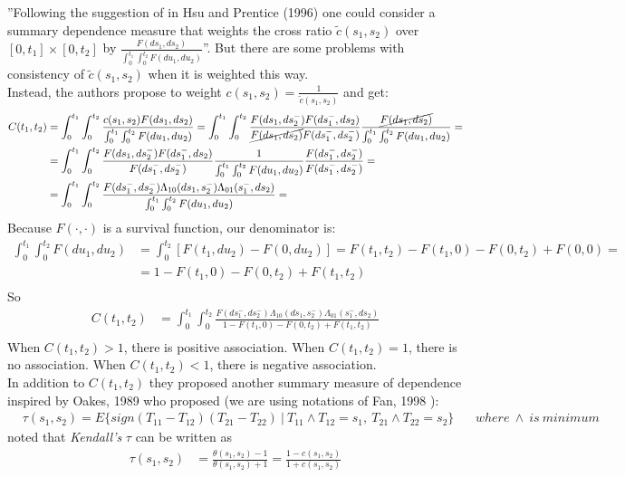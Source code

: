 \documentclass[]{article}
\begin{document}
''Following the suggestion of in Hsu and Prentice (1996) one could consider a summary dependence measure that weights the cross ratio $\tilde{c}(s_1, s_2)$ over $[0, t_1]\times[0, t_2]$ by $\frac{F(ds_1,ds_2)}{\int_0^{t_1}\int_0^{t_2} F(du_1, du_2)}$''. But there are some problems with consistency of $\tilde{c}(s_1, s_2)$ when it is weighted this way.\\
Instead, the authors propose to weight $c(s_1, s_2) = \frac{1}{\tilde{c}(s_1, s_2)}$ and get:
	$$
	\begin{aligned}
		C(t_1, t_2) &= \int_0^{t_1}\int_0^{t_2} \frac{c(s_1, s_2)F(ds_1,ds_2)}{\int_0^{t_1}\int_0^{t_2} F(du_1, du_2)} =\int_0^{t_1}\int_0^{t_2} \frac{F(ds_1, ds_2^-)F(ds_1^-, ds_2)} {\cancel{F(ds_1, ds_2)}F(ds_1^-, ds_2^-)} \frac{\cancel{F(ds_1,ds_2)}}{\int_0^{t_1}\int_0^{t_2} F(du_1, du_2)} = \\
		&= \int_0^{t_1}\int_0^{t_2} \frac{F(ds_1, ds_2^-)F(ds_1^-, ds_2)} {F(ds_1^-, ds_2^-)} \frac{1}{\int_0^{t_1}\int_0^{t_2} F(du_1, du_2)} \frac{F(ds_1^-, ds_2^-)}{F(ds_1^-, ds_2^-)}= \\
		&= \int_0^{t_1}\int_0^{t_2} \frac{F(ds_1^-, ds_2^-)\Lambda_{10}(ds_1, s^-_2)\Lambda_{01}(s^-_1, ds_2)}{\int_0^{t_1}\int_0^{t_2} F(du_1, du_2)} = \\
	\end{aligned}
	$$
	Because $F(\cdot, \cdot)$ is a survival function, our denominator is:
	$$
	\begin{aligned}
		\int_0^{t_1}\int_0^{t_2} F(du_1, du_2) &= \int_0^{t_2} [F(t_1, du_2) - F(0, du_2)]= F(t_1, t_2) - F(t_1, 0) - F(0, t_2) + F(0,0)=\\
		&=1 - F(t_1, 0) - F(0, t_2)+ F(t_1, t_2)\\
	\end{aligned}
	$$
	So
	$$
	\begin{aligned}
		C(t_1, t_2) &= \int_0^{t_1}\int_0^{t_2} \frac{F(ds_1^-, ds_2^-)\Lambda_{10}(ds_1, s^-_2)\Lambda_{01}(s^-_1, ds_2)}{1 - F(t_1, 0) - F(0, t_2)+ F(t_1, t_2)} \\
	\end{aligned}
	$$
	When $C(t_1, t_2)>1$, there is positive association. When $C(t_1, t_2)=1$, there is no association. When $C(t_1, t_2)<1$, there is negative association.  \\
	In addition to $C(t_1, t_2)$ they proposed another summary measure of dependence inspired by Oakes, 1989 \cite{oakes1989bivariate} who proposed (we are using notations of Fan, 1998 \cite{fan2000dependence}):
	$$
	\begin{aligned}
		&\tau(s_1, s_2) = E\{sign(T_{11} - T_{12}) (T_{21} - T_{22})~|~ T_{11}\wedge T_{12} = s_1,~T_{21}\wedge T_{22} = s_2  \}
		&~~~~where~\wedge~is~minimum
	\end{aligned}
	$$
\cite{oakes1989bivariate} noted that \emph{Kendall's} $\tau$ can be written as
	$$
	\begin{aligned}
		\tau(s_1, s_2) &= \frac{\theta(s_1, s_2) - 1}{\theta(s_1, s_2) + 1} =\frac{1 - c(s_1, s_2)}{1+c(s_1, s_2)}
	\end{aligned}
	$$
  
\end{document}
